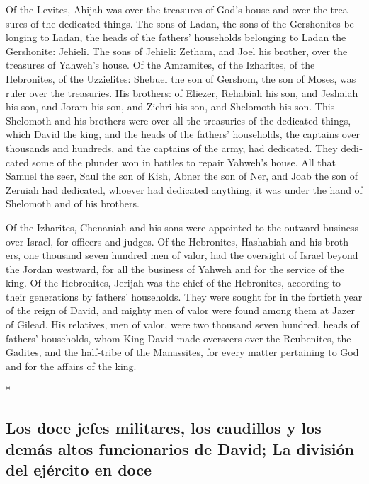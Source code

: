 \begin{paracol}{2}
\begin{otherlanguage}{english}
 Of the Levites, Ahijah was over the treasures of God's
house and over the treasures of the dedicated things. 
The sons of Ladan, the sons of the Gershonites belonging to Ladan, the
heads of the fathers' households belonging to Ladan the Gershonite:
Jehieli.  The sons of Jehieli: Zetham, and Joel his
brother, over the treasures of Yahweh's house.  Of the
Amramites, of the Izharites, of the Hebronites, of the Uzzielites:
 Shebuel the son of Gershom, the son of Moses, was ruler
over the treasuries.  His brothers: of Eliezer, Rehabiah
his son, and Jeshaiah his son, and Joram his son, and Zichri his son,
and Shelomoth his son.  This Shelomoth and his brothers
were over all the treasuries of the dedicated things, which David the
king, and the heads of the fathers' households, the captains over
thousands and hundreds, and the captains of the army, had dedicated.
 They dedicated some of the plunder won in battles to
repair Yahweh's house.  All that Samuel the seer, Saul
the son of Kish, Abner the son of Ner, and Joab the son of Zeruiah had
dedicated, whoever had dedicated anything, it was under the hand of
Shelomoth and of his brothers.

 Of the Izharites, Chenaniah and his sons were appointed
to the outward business over Israel, for officers and judges.
 Of the Hebronites, Hashabiah and his brothers, one
thousand seven hundred men of valor, had the oversight of Israel beyond
the Jordan westward, for all the business of Yahweh and for the service
of the king.  Of the Hebronites, Jerijah was the chief of
the Hebronites, according to their generations by fathers' households.
They were sought for in the fortieth year of the reign of David, and
mighty men of valor were found among them at Jazer of Gilead.
 His relatives, men of valor, were two thousand seven
hundred, heads of fathers' households, whom King David made overseers
over the Reubenites, the Gadites, and the half-tribe of the Manassites,
for every matter pertaining to God and for the affairs of the king.

\end{otherlanguage}

\switchcolumn[0]*

\hypertarget{los-doce-jefes-militares-los-caudillos-y-los-demuxe1s-altos-funcionarios-de-david-la-divisiuxf3n-del-ejuxe9rcito-en-doce}{%
\subsection{Los doce jefes militares, los caudillos y los demás altos
funcionarios de David; La división del ejército en
doce}\label{los-doce-jefes-militares-los-caudillos-y-los-demuxe1s-altos-funcionarios-de-david-la-divisiuxf3n-del-ejuxe9rcito-en-doce}}


\end{paracol}
